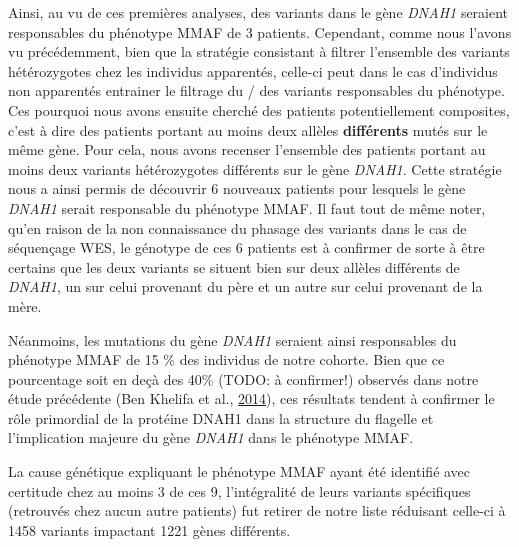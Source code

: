 \documentclass[12pt,twoside]{reedthesis}
\theoremstyle{definition}
\theoremstyle{definition}
\theoremstyle{remark}
\begin{document}
  Ainsi, au vu de ces premières analyses, des variants dans le gène
  \emph{DNAH1} seraient responsables du phénotype MMAF de 3 patients.
  Cependant, comme nous l'avons vu précédemment, bien que la stratégie
  consistant à filtrer l'ensemble des variants hétérozygotes chez les
  individus apparentés, celle-ci peut dans le cas d'individus non
  apparentés entrainer le filtrage du / des variants responsables du
  phénotype. Ces pourquoi nous avons ensuite cherché des patients
  potentiellement composites, c'est à dire des patients portant au moins
  deux allèles \textbf{différents} mutés sur le même gène. Pour cela, nous
  avons recenser l'ensemble des patients portant au moins deux variants
  hétérozygotes différents sur le gène \emph{DNAH1}. Cette stratégie nous
  a ainsi permis de découvrir 6 nouveaux patients pour lesquels le gène
  \emph{DNAH1} serait responsable du phénotype MMAF. Il faut tout de même
  noter, qu'en raison de la non connaissance du phasage des variants dans
  le cas de séquençage WES, le génotype de ces 6 patients est à confirmer
  de sorte à être certains que les deux variants se situent bien sur deux
  allèles différents de \emph{DNAH1}, un sur celui provenant du père et un
  autre sur celui provenant de la mère.
  
  Néanmoins, les mutations du gène \emph{DNAH1} seraient ainsi
  responsables du phénotype MMAF de 15 \% des individus de notre cohorte.
  Bien que ce pourcentage soit en deçà des 40\% (TODO: à confirmer!)
  observés dans notre étude précédente (Ben Khelifa et al.,
  \protect\hyperlink{ref-BenKhelifa2014}{2014}), ces résultats tendent à
  confirmer le rôle primordial de la protéine DNAH1 dans la structure du
  flagelle et l'implication majeure du gène \emph{DNAH1} dans le phénotype
  MMAF.
  
  La cause génétique expliquant le phénotype MMAF ayant été identifié avec
  certitude chez au moins 3 de ces 9, l'intégralité de leurs variants
  spécifiques (retrouvés chez aucun autre patients) fut retirer de notre
  liste réduisant celle-ci à 1458 variants impactant 1221 gènes
  différents.
  
  \newpage
  
\end{document}
